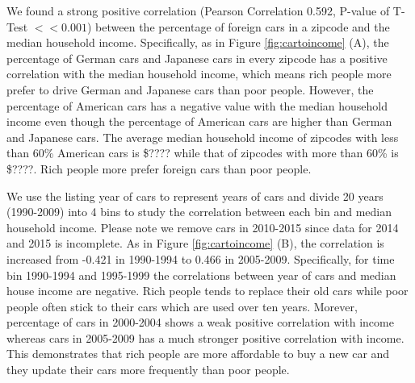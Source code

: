 \documentclass[10pt,twocolumn,letterpaper]{article}
\begin{document}
We found a strong positive correlation (Pearson Correlation 0.592, P-value of T-Test $<< 0.001$) between the percentage of foreign cars in a zipcode and the median household income. Specifically, as in Figure \ref{fig:cartoincome} (A), the percentage of German cars and Japanese cars in every zipcode has a positive correlation with the median household income, which means rich people more prefer to drive German and Japanese cars than poor people. However, the percentage of American cars has a negative value with the median household income even though the percentage of American cars are higher than German and Japanese cars. The average median household income of zipcodes with less than 60\% American cars is \$???? while that of zipcodes with more than 60\% is \$????. Rich people more prefer foreign cars than poor people.

We use the listing year of cars to represent years of cars and divide 20 years (1990-2009) into 4 bins to study the correlation between each bin and median household income. Please note we remove cars in 2010-2015 since data for 2014 and 2015 is incomplete. As in Figure \ref{fig:cartoincome} (B), the correlation is increased from -0.421 in 1990-1994 to 0.466 in 2005-2009. Specifically, for time bin 1990-1994 and 1995-1999 the correlations between year of cars and median house income are negative. Rich people tends to replace their old cars while poor people often stick to their cars which are used over ten years. Morever, percentage of cars in 2000-2004 shows a weak positive correlation with income whereas cars in 2005-2009 has a much stronger positive correlation with income. This demonstrates that rich people are more affordable to buy a new car and they update their cars more frequently than poor people.
\end{document}

